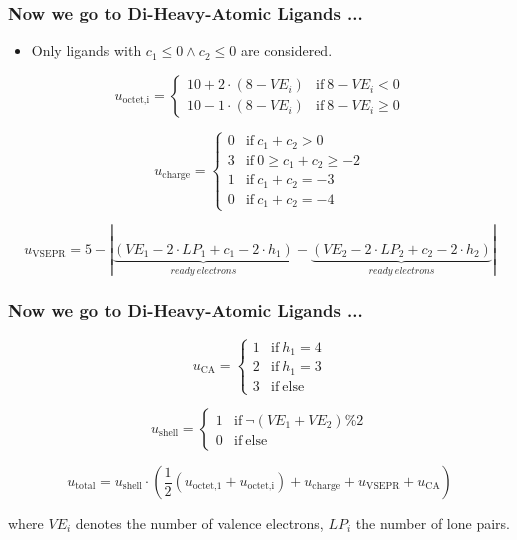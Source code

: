 \documentclass{beamer}
\begin{document}
\begin{frame}
\frametitle{Now we go to Di-Heavy-Atomic Ligands ...}
\begin{itemize}
	\item Only ligands with $c_1 \leq 0 \wedge c_2 \leq 0$ are considered.
\end{itemize}
\begin{equation}
u_{\textrm{octet,i}} = 
\begin{cases}
10 + 2 \cdot (8-VE_i) 	& \mathrm{if}~ 8-VE_i < 0 \\
10 - 1 \cdot (8-VE_i) 	& \mathrm{if}~ 8-VE_i \geq 0
\end{cases}
\end{equation}

\begin{equation}
u_{\textrm{charge}} = 
\begin{cases}
0	&	\mathrm{if}~ c_1 + c_2 > 0 \\
3	&	\mathrm{if}~ 0 \geq c_1 + c_2 \geq -2 \\
1   &	\mathrm{if}~ c_1 + c_2 = -3 \\
0   &	\mathrm{if}~ c_1 + c_2 = -4 
\end{cases}
\end{equation}

\begin{equation}
u_{\textrm{VSEPR}} = 
 5-|\underbrace{(VE_1 - 2 \cdot LP_1 + c_1 - 2 \cdot h_1)}_{ready~electrons} -  \underbrace{(VE_2 - 2 \cdot LP_2 + c_2 - 2 \cdot h_2)}_{ready~electrons}|
\end{equation}
\end{frame}



\begin{frame}
\frametitle{Now we go to Di-Heavy-Atomic Ligands ...}

\begin{equation}
u_{\textrm{CA}} = 
\begin{cases}
1	&	\mathrm{if}~ h_1 = 4 \\
2	&	\mathrm{if}~ h_1 = 3 \\
3   &	\mathrm{if}~ \textrm{else} 
\end{cases}
\end{equation}

\begin{equation}
u_{\textrm{shell}} = 
\begin{cases}
1	&	\mathrm{if}~ \neg (VE_1+VE_2) \% 2 \\
0	&	\mathrm{if}~ \textrm{else}
\end{cases}
\end{equation}

\begin{equation}
u_{\textrm{total}} = u_{\textrm{shell}} \cdot \left( \frac{1}{2} ( u_{\textrm{octet,1}} + u_{\textrm{octet,i}} ) + u_{\textrm{charge}} + u_{\textrm{VSEPR}} + u_{\textrm{CA}} \right)
\end{equation}

where $VE_i$ denotes the number of valence electrons, $LP_i$ the number of lone pairs.
\end{frame}
\end{document}
